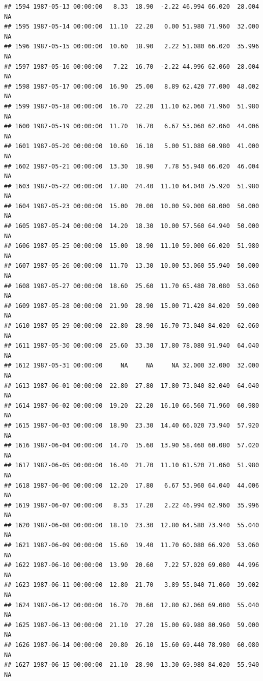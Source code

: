 \documentclass{article}\usepackage{graphicx, color}
\makeatletter
\newenvironment{kframe}{%
 \def\at@end@of@kframe{}%
 \ifinner\ifhmode%
  \def\at@end@of@kframe{\end{minipage}}%
  \begin{minipage}{\columnwidth}%
 \fi\fi%
 \def\FrameCommand##1{\hskip\@totalleftmargin \hskip-\fboxsep
 \colorbox{shadecolor}{##1}\hskip-\fboxsep
     \hskip-\linewidth \hskip-\@totalleftmargin \hskip\columnwidth}%
 \MakeFramed {\advance\hsize-\width
   \@totalleftmargin\z@ \linewidth\hsize
   \@setminipage}}%
 {\par\unskip\endMakeFramed%
 \at@end@of@kframe}
\newenvironment{knitrout}{}{} %
\makeatother
\begin{document}
\begin{knitrout}
\begin{kframe}
\begin{verbatim}
## 1594 1987-05-13 00:00:00   8.33  18.90  -2.22 46.994 66.020  28.004     NA
## 1595 1987-05-14 00:00:00  11.10  22.20   0.00 51.980 71.960  32.000     NA
## 1596 1987-05-15 00:00:00  10.60  18.90   2.22 51.080 66.020  35.996     NA
## 1597 1987-05-16 00:00:00   7.22  16.70  -2.22 44.996 62.060  28.004     NA
## 1598 1987-05-17 00:00:00  16.90  25.00   8.89 62.420 77.000  48.002     NA
## 1599 1987-05-18 00:00:00  16.70  22.20  11.10 62.060 71.960  51.980     NA
## 1600 1987-05-19 00:00:00  11.70  16.70   6.67 53.060 62.060  44.006     NA
## 1601 1987-05-20 00:00:00  10.60  16.10   5.00 51.080 60.980  41.000     NA
## 1602 1987-05-21 00:00:00  13.30  18.90   7.78 55.940 66.020  46.004     NA
## 1603 1987-05-22 00:00:00  17.80  24.40  11.10 64.040 75.920  51.980     NA
## 1604 1987-05-23 00:00:00  15.00  20.00  10.00 59.000 68.000  50.000     NA
## 1605 1987-05-24 00:00:00  14.20  18.30  10.00 57.560 64.940  50.000     NA
## 1606 1987-05-25 00:00:00  15.00  18.90  11.10 59.000 66.020  51.980     NA
## 1607 1987-05-26 00:00:00  11.70  13.30  10.00 53.060 55.940  50.000     NA
## 1608 1987-05-27 00:00:00  18.60  25.60  11.70 65.480 78.080  53.060     NA
## 1609 1987-05-28 00:00:00  21.90  28.90  15.00 71.420 84.020  59.000     NA
## 1610 1987-05-29 00:00:00  22.80  28.90  16.70 73.040 84.020  62.060     NA
## 1611 1987-05-30 00:00:00  25.60  33.30  17.80 78.080 91.940  64.040     NA
## 1612 1987-05-31 00:00:00     NA     NA     NA 32.000 32.000  32.000     NA
## 1613 1987-06-01 00:00:00  22.80  27.80  17.80 73.040 82.040  64.040     NA
## 1614 1987-06-02 00:00:00  19.20  22.20  16.10 66.560 71.960  60.980     NA
## 1615 1987-06-03 00:00:00  18.90  23.30  14.40 66.020 73.940  57.920     NA
## 1616 1987-06-04 00:00:00  14.70  15.60  13.90 58.460 60.080  57.020     NA
## 1617 1987-06-05 00:00:00  16.40  21.70  11.10 61.520 71.060  51.980     NA
## 1618 1987-06-06 00:00:00  12.20  17.80   6.67 53.960 64.040  44.006     NA
## 1619 1987-06-07 00:00:00   8.33  17.20   2.22 46.994 62.960  35.996     NA
## 1620 1987-06-08 00:00:00  18.10  23.30  12.80 64.580 73.940  55.040     NA
## 1621 1987-06-09 00:00:00  15.60  19.40  11.70 60.080 66.920  53.060     NA
## 1622 1987-06-10 00:00:00  13.90  20.60   7.22 57.020 69.080  44.996     NA
## 1623 1987-06-11 00:00:00  12.80  21.70   3.89 55.040 71.060  39.002     NA
## 1624 1987-06-12 00:00:00  16.70  20.60  12.80 62.060 69.080  55.040     NA
## 1625 1987-06-13 00:00:00  21.10  27.20  15.00 69.980 80.960  59.000     NA
## 1626 1987-06-14 00:00:00  20.80  26.10  15.60 69.440 78.980  60.080     NA
## 1627 1987-06-15 00:00:00  21.10  28.90  13.30 69.980 84.020  55.940     NA

\end{verbatim}
\end{kframe}
\end{knitrout}
\end{document}

